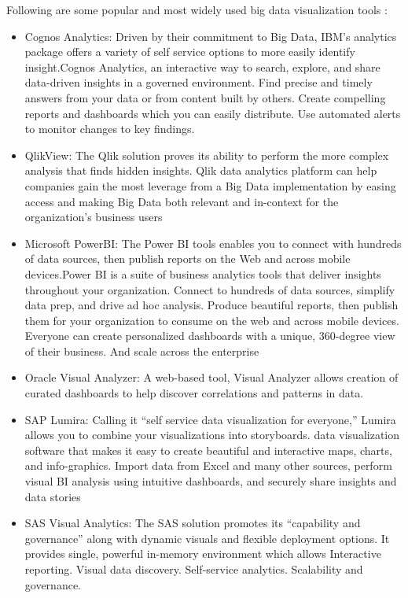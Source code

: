 \documentclass[sigconf]{acmart}
\begin{document}
Following are some popular and most widely used big data visualization tools :
\begin{itemize}
\item Cognos Analytics: Driven by their commitment to Big Data, IBM’s analytics package offers a variety of self service options to more easily identify insight.Cognos Analytics, an interactive way to search, explore, and share data-driven insights in a governed environment. Find precise and timely answers from your data or from content built by others. Create compelling reports and dashboards which you can easily distribute. Use automated alerts to monitor changes to key findings. 

\item QlikView: The Qlik solution proves its ability to perform the more complex analysis that finds hidden insights. Qlik data analytics platform can help companies gain the most leverage from a Big Data implementation by easing access and making Big Data both relevant and in-context for the organization's business users

\item Microsoft PowerBI: The Power BI tools enables you to connect with hundreds of data sources, then publish reports on the Web and across mobile devices.Power BI is a suite of business analytics tools that deliver insights throughout your organization. Connect to hundreds of data sources, simplify data prep, and drive ad hoc analysis. Produce beautiful reports, then publish them for your organization to consume on the web and across mobile devices. Everyone can create personalized dashboards with a unique, 360-degree view of their business. And scale across the enterprise\cite{sept1007}

\item Oracle Visual Analyzer: A web-based tool, Visual Analyzer allows creation of curated dashboards to help discover correlations and patterns in data. 

\item SAP Lumira: Calling it “self service data visualization for everyone,” Lumira allows you to combine your visualizations into storyboards. data visualization software that makes it easy to create beautiful and interactive maps, charts, and info-graphics. Import data from Excel and many other sources, perform visual BI analysis using intuitive dashboards, and securely share insights and data stories 

\item SAS Visual Analytics: The SAS solution promotes its ``capability and governance'' along with dynamic visuals and flexible deployment options. It provides single, powerful in-memory environment which allows Interactive reporting. Visual data discovery. Self-service analytics. Scalability and governance.


\end{itemize}
\end{document}
